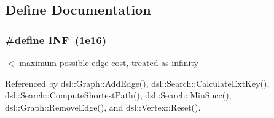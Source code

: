 \subsection{Define Documentation}
\subsubsection[{INF}]{\setlength{\rightskip}{0pt plus 5cm}\#define INF~(1e16)}\label{__CPack__Packages_2Linux_2STGZ_2dsl-1_80_80-Linux_2include_2dsl_2vertex_8h_a12c2040f25d8e3a7b9e1c2024c618cb6}


$<$ maximum possible edge cost, treated as infinity 



Referenced by dsl::Graph::AddEdge(), dsl::Search::CalculateExtKey(), dsl::Search::ComputeShortestPath(), dsl::Search::MinSucc(), dsl::Graph::RemoveEdge(), and dsl::Vertex::Reset().

